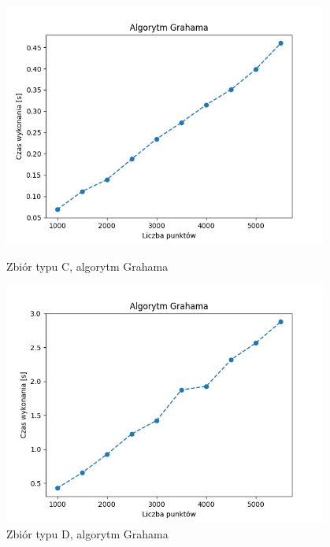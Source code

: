 \documentclass[11pt]{article}
\theoremstyle{remark} \newtheorem{definition}{def.}
\theoremstyle{definition} \newtheorem{twierdzenie}{tw.}
\begin{document}
\begin{figure}[]
    \centering
    \begin{minipage}{0.48\textwidth}
        \centering
        \includegraphics[width=0.95\textwidth]{../tests/prost-graham.png} %
        \caption{Zbiór typu C, algorytm Grahama}
        \label{fig:prost-graham}
    \end{minipage}\hfill
    \begin{minipage}{0.48\textwidth}
        \centering
        \includegraphics[width=0.95\textwidth]{../tests/kw-graham.png} %
        \caption{Zbiór typu D, algorytm Grahama}
        \label{fig:kw-graham}
    \end{minipage}
\end{figure}
\end{document}
